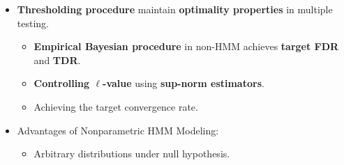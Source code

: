 \documentclass[10pt, aspectratio=169]{beamer}
\begin{document}
\begin{frame}
    \begin{itemize}[label=\scalebox{0.5}{$\bullet$}]
        \item \textbf{Thresholding procedure} maintain \textbf{optimality properties} in multiple testing.
        \vspace{0.6em}
        \begin{itemize}[label=\scalebox{0.5}{$\circ$}]
            \item \textbf{Empirical Bayesian procedure} in non-HMM achieves \textbf{target FDR} and \textbf{TDR}.
            \vspace{0.6em}
            \item \textbf{Controlling \(\ell\)-value} using \textbf{sup-norm estimators}.
            \vspace{0.6em}
            \item Achieving the target convergence rate.
        \end{itemize}
        \vspace{0.6em}
        \item Advantages of Nonparametric HMM Modeling:
        \vspace{0.6em}
        \begin{itemize}[label=\scalebox{0.5}{$\star$}]
            \item Arbitrary distributions under null hypothesis.
        \end{itemize}
    \end{itemize}
\end{frame}
% 
\end{document}
